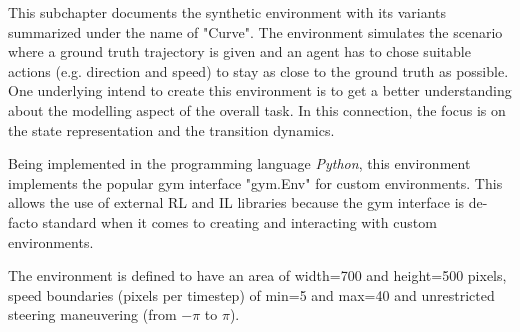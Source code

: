 This subchapter documents the synthetic environment with its variants summarized under the name of "Curve". The environment simulates the scenario where a ground truth trajectory is given and an agent has to chose suitable actions (e.g. direction and speed) to stay as close to the ground truth as possible. One underlying intend to create this environment is to get a better understanding about the modelling aspect of the overall task. In this connection, the focus is on the state representation and the transition dynamics.
\par
Being implemented in the programming language \textit{Python}, this environment implements the popular gym interface "gym.Env" \cite[]{gym} for custom environments. This allows the use of external RL and IL libraries because the gym interface is de-facto standard when it comes to creating and interacting with custom environments.
\par
The environment is defined to have an area of width=700 and height=500 pixels, speed boundaries (pixels per timestep) of min=5 and max=40 and unrestricted steering maneuvering (from $-\pi$ to $\pi$).